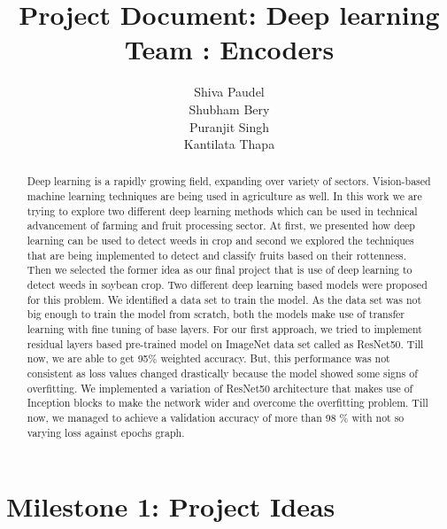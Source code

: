 \documentclass{report}
\title{Project Document: Deep learning \\ Team : Encoders}
\author{Shiva Paudel\\
Shubham Bery\\
Puranjit Singh\\
Kantilata Thapa\\
}
\date{}
\begin{document}
\maketitle

\tableofcontents

\begin{abstract}
Deep learning is a rapidly growing field, expanding over variety of sectors. Vision-based machine learning techniques are being used in agriculture as well. In this work we are trying to explore two different deep learning methods which can be used in technical advancement of farming and fruit processing sector. At first, we presented how deep learning can be used to detect weeds in crop and second we explored the techniques that are being implemented to detect and classify fruits based on their rottenness. Then we selected the former idea as our final project that is use of deep learning to detect weeds in soybean crop. Two different deep learning based models were proposed for this problem. We identified a data set to train the model. As the data set was not big enough to train the model from scratch, both the models make use of transfer learning with fine tuning of base layers. For our first approach, we tried to implement residual layers based pre-trained model on ImageNet data set called as ResNet50. Till now, we are able to get 95\% weighted accuracy. But, this performance was not consistent as loss values changed drastically because the model showed some signs of overfitting. We implemented a variation of ResNet50 architecture that makes use of Inception blocks to make the network wider and overcome the overfitting problem. Till now, we managed to achieve a validation accuracy of more than 98 \% with not so varying loss against epochs graph.
\end{abstract}

\chapter{Milestone 1: Project Ideas}
\end{document}
